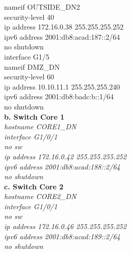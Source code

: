 \documentclass[12pt,a4paper]{report}
\begin{document}
{\hspace*{2cm}nameif OUTSIDE\_DN2\\
\hspace*{2cm}security-level 40\\
\hspace*{2cm}ip address 172.16.0.38 255.255.255.252\\
\hspace*{2cm}ipv6 address 2001:db8:acad:187::2/64\\
\hspace*{2cm}no shutdown\\
\hspace*{2cm}interface G1/5\\
\hspace*{2cm}nameif DMZ\_DN\\
\hspace*{2cm}security-level 60\\
\hspace*{2cm}ip address 10.10.11.1 255.255.255.240\\
\hspace*{2cm}ipv6 address 2001:db8:badc:b::1/64\\
\hspace*{2cm}no shutdown\\}
\hspace*{1cm}\textbf{b. Switch Core 1}\\
\hspace*{2cm}\textit{hostname CORE1\_DN\\
\hspace*{2cm}interface G1/0/1\\
\hspace*{2cm}no sw\\
\hspace*{2cm}ip address 172.16.0.42 255.255.255.252\\
\hspace*{2cm}ipv6 address 2001:db8:acad:188::2/64\\
\hspace*{2cm}no shutdown\\}
\hspace*{1cm}\textbf{c. Switch Core 2}\\
\hspace*{2cm}\textit{hostname CORE2\_DN\\
\hspace*{2cm}interface G1/0/1\\
\hspace*{2cm}no sw\\
\hspace*{2cm}ip address 172.16.0.46 255.255.255.252\\
\hspace*{2cm}ipv6 address 2001:db8:acad:189::2/64\\
\hspace*{2cm}no shutdown\\}
\end{document}
